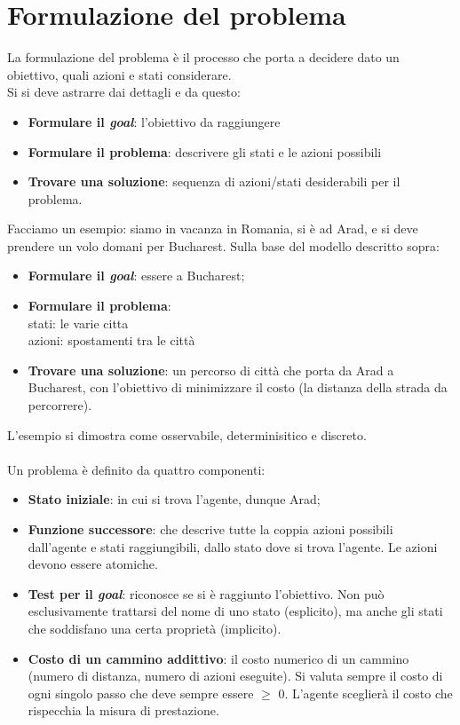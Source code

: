 \documentclass[10pt,a4paper]{book}
\begin{document}
\section{Formulazione del problema}
La formulazione del problema \`e il processo che porta a decidere dato un obiettivo, quali azioni e stati considerare.\\
Si si deve astrarre dai dettagli e da questo:
\begin{itemize}
\item \textbf{Formulare il \textit{goal}}: l'obiettivo da raggiungere
\item \textbf{Formulare il problema}: descrivere gli stati e le azioni possibili
\item \textbf{Trovare una soluzione}: sequenza di azioni/stati desiderabili per il problema.
\end{itemize}
\noindent
Facciamo un esempio: siamo in vacanza in Romania, si \`e ad Arad, e si deve prendere un volo domani per Bucharest. Sulla base del modello descritto sopra:
\begin{itemize}
\item \textbf{Formulare il \textit{goal}}: essere a Bucharest;
\item \textbf{Formulare il problema}:\\ stati: le varie citta\\
azioni: spostamenti tra le citt\`a
\item \textbf{Trovare una soluzione}: un percorso di citt\`a che porta da Arad a Bucharest, con l'obiettivo di minimizzare il costo (la distanza della strada da percorrere).
\end{itemize}
\noindent
L'esempio si dimostra come osservabile, determinisitico e discreto.\\\\
Un problema \`e definito da quattro componenti:
\begin{itemize}
\item  \textbf{Stato iniziale}: in cui si trova l'agente, dunque Arad;
\item  \textbf{Funzione successore}: che descrive tutte la coppia azioni possibili dall'agente e stati raggiungibili, dallo stato dove si trova l'agente. Le azioni devono essere atomiche.
\item  \textbf{Test per il \textit{goal}}: riconosce se si \`e raggiunto l'obiettivo. Non pu\`o esclusivamente trattarsi del nome di uno stato (esplicito), ma anche gli stati che soddisfano una certa propriet\`a (implicito).
\item  \textbf{Costo di un cammino addittivo}: il costo numerico di un cammino (numero di distanza, numero di azioni eseguite).  Si valuta sempre il costo di ogni singolo passo che deve sempre essere $\ge$ 0. L'agente sceglier\`a il costo che rispecchia la misura di prestazione.
\end{itemize}
\end{document}
